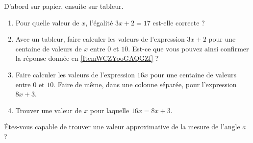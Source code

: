 
\begin{exercice}\label{exo2smath-0230}

    D'abord sur papier, ensuite sur tableur.
    \begin{enumerate}
        \item   \label{ItemWCZYooGAQGZf}
            Pour quelle valeur de \( x\), l'égalité \( 3x+2=17\) est-elle correcte ?
        \item
            Avec un tableur, faire calculer les valeurs de l'expression \( 3x+2\) pour une centaine de valeurs de \( x\) entre \( 0\) et \( 10\). Est-ce que vous pouvez ainsi confirmer la réponse donnée en \ref{ItemWCZYooGAQGZf} ?
        \item
            Faire calculer les valeurs de l'expression \( 16x\) pour une centaine de valeurs entre \( 0\) et \( 10\). Faire de même, dans une colonne séparée, pour l'expression \( 8x+3\).
        \item
            Trouver une valeur de \( x\) pour laquelle \( 16x=8x+3\).
    \end{enumerate}
    Êtes-vous capable de trouver une valeur approximative de la mesure de l'angle \( a\) ?

\begin{center}
    
\end{center}

\end{exercice}

